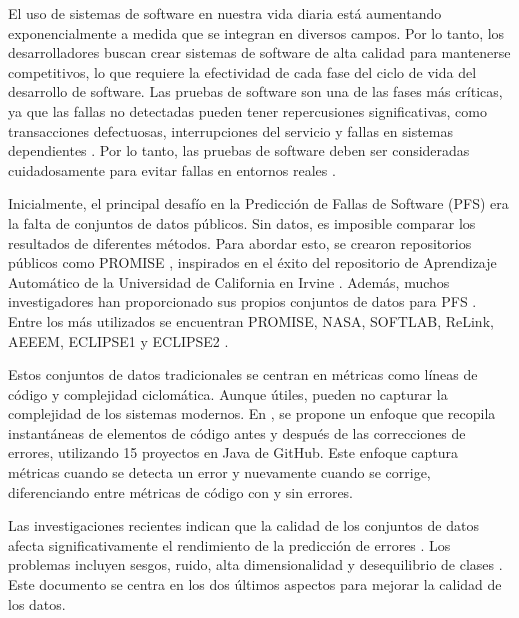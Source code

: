 \fontsize{14}{15}\selectfont


El uso de sistemas de software en nuestra vida diaria está aumentando exponencialmente a medida que se integran en diversos campos. Por lo tanto, los desarrolladores buscan crear sistemas de software de alta calidad para mantenerse competitivos, lo que requiere la efectividad de cada fase del ciclo de vida del desarrollo de software. Las pruebas de software son una de las fases más críticas, ya que las fallas no detectadas pueden tener repercusiones significativas, como transacciones defectuosas, interrupciones del servicio y fallas en sistemas dependientes \cite{mohsin2022span,singh2024improved}. Por lo tanto, las pruebas de software deben ser consideradas cuidadosamente para evitar fallas en entornos reales \cite{singh2024improved,ferenc_automatically_2020}.

Inicialmente, el principal desafío en la Predicción de Fallas de Software (PFS) era la falta de conjuntos de datos públicos. Sin datos, es imposible comparar los resultados de diferentes métodos. Para abordar esto, se crearon repositorios públicos como PROMISE \cite{Sayyad-Shirabad+Menzies:2005}, inspirados en el éxito del repositorio de Aprendizaje Automático de la Universidad de California en Irvine \cite{uci_ref}. Además, muchos investigadores han proporcionado sus propios conjuntos de datos para PFS \cite{li_progress_2018}. Entre los más utilizados se encuentran PROMISE, NASA, SOFTLAB, ReLink, AEEEM, ECLIPSE1 y ECLIPSE2 \cite{shepperd2013data,d2012evaluating,wu2011relink,zimmermann2007predicting,kim2011dealing}.

Estos conjuntos de datos tradicionales se centran en métricas como líneas de código y complejidad ciclomática. Aunque útiles, pueden no capturar la complejidad de los sistemas modernos. En \cite{ferenc_automatically_2020}, se propone un enfoque que recopila instantáneas de elementos de código antes y después de las correcciones de errores, utilizando 15 proyectos en Java de GitHub. Este enfoque captura métricas cuando se detecta un error y nuevamente cuando se corrige, diferenciando entre métricas de código con y sin errores.

Las investigaciones recientes indican que la calidad de los conjuntos de datos afecta significativamente el rendimiento de la predicción de errores \cite{rathi_empirical_2023}. Los problemas incluyen sesgos, ruido, alta dimensionalidad y desequilibrio de clases \cite{liu_empirical_2015,8494821}. Este documento se centra en los dos últimos aspectos para mejorar la calidad de los datos.


